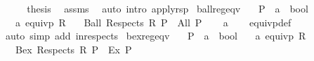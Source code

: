 \begin{isabellebody}
\ \ \isamarkupfalse%
\ \isamarkupfalse%
\ {\isacharquery}{\kern0pt}thesis\ \isamarkupfalse%
\ assms{\isacharparenleft}{\kern0pt}{}{\isacharparenright}{\kern0pt}\ \isamarkupfalse%
\ {\isacharparenleft}{\kern0pt}auto\ intro{\isacharcolon}{\kern0pt}\ apply{\isacharunderscore}{\kern0pt}rsp{\isacharprime}{\kern0pt}{\isacharparenright}{\kern0pt}\isanewline
{}\isamarkupfalse%
%
\endisatagproof
{\isafoldproof}%
%
\isadelimproof
%
\endisadelimproof
%
\isadelimdocument
%
\endisadelimdocument
%
\isatagdocument
%
\isamarkuptrue%
%
\endisatagdocument
{\isafolddocument}%
%
\isadelimdocument
%
\endisadelimdocument
{}\isamarkupfalse%
\ ball{\isacharunderscore}{\kern0pt}reg{\isacharunderscore}{\kern0pt}eqv{\isacharcolon}{\kern0pt}\isanewline
\ \ \ P\ {\isacharcolon}{\kern0pt}{\isacharcolon}{\kern0pt}\ {\isachardoublequoteopen}{\isacharprime}{\kern0pt}a\ {\isasymRightarrow}\ bool{\isachardoublequoteclose}\isanewline
\ \ \ a{\isacharcolon}{\kern0pt}\ {\isachardoublequoteopen}equivp\ R{\isachardoublequoteclose}\isanewline
\ \ \ {\isachardoublequoteopen}Ball\ {\isacharparenleft}{\kern0pt}Respects\ R{\isacharparenright}{\kern0pt}\ P\ {\isacharequal}{\kern0pt}\ {\isacharparenleft}{\kern0pt}All\ P{\isacharparenright}{\kern0pt}{\isachardoublequoteclose}\isanewline
%
\isadelimproof
\ \ %
\endisadelimproof
%
\isatagproof
{}\isamarkupfalse%
\ a\isanewline
\ \ \isamarkupfalse%
\ equivp{\isacharunderscore}{\kern0pt}def\isanewline
\ \ \isamarkupfalse%
\ {\isacharparenleft}{\kern0pt}auto\ simp\ add{\isacharcolon}{\kern0pt}\ in{\isacharunderscore}{\kern0pt}respects{\isacharparenright}{\kern0pt}%
\endisatagproof
{\isafoldproof}%
%
\isadelimproof
\isanewline
%
\endisadelimproof
\isanewline
{}\isamarkupfalse%
\ bex{\isacharunderscore}{\kern0pt}reg{\isacharunderscore}{\kern0pt}eqv{\isacharcolon}{\kern0pt}\isanewline
\ \ \ P\ {\isacharcolon}{\kern0pt}{\isacharcolon}{\kern0pt}\ {\isachardoublequoteopen}{\isacharprime}{\kern0pt}a\ {\isasymRightarrow}\ bool{\isachardoublequoteclose}\isanewline
\ \ \ a{\isacharcolon}{\kern0pt}\ {\isachardoublequoteopen}equivp\ R{\isachardoublequoteclose}\isanewline
\ \ \ {\isachardoublequoteopen}Bex\ {\isacharparenleft}{\kern0pt}Respects\ R{\isacharparenright}{\kern0pt}\ P\ {\isacharequal}{\kern0pt}\ {\isacharparenleft}{\kern0pt}Ex\ P{\isacharparenright}{\kern0pt}{\isachardoublequoteclose}\isanewline

\end{isabellebody}
